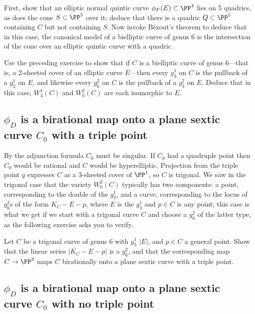 \begin{exercise}
First, show that an elliptic normal quintic curve $\phi_F(E) \subset \PP^4$ lies on 5 quadrics, as does the cone $S \subset \PP^5$ over it; deduce that there is a quadric $Q \subset \PP^5$ containing $C$ but not containing $S$. Now invoke B\'ezout's theorem to deduce that in this case, the canonical model of a bielliptic curve of genus 6 is the intersection of the cone over an elliptic quintic curve with a quadric.
\end{exercise}


\begin{exercise}
Use the preceding exercise to show that if $C$ is a bielliptic curve of genus 6---that is, a 2-sheeted cover of an elliptic curve $E$---then every $g^1_4$ on $C$ is the pullback of a $g^1_2$ on $E$, and likewise  every $g^2_6$ on $C$ is the pullback of a $g^2_3$ on $E$. Deduce that in this case, $W^1_4(C)$ and $W^2_6(C)$ are each isomorphic to $E$.
\end{exercise}

\subsection{$\phi_{D}$ is a birational map onto a plane sextic curve $C_{0}$ with a triple point}

By the adjunction formula $C_0$ must be singular. If $C_0$ had a quadruple point then $C_{0}$
would be rational and  $C$ would be hyperelliptic.
Projection from the triple point $q$ expresses $C$ as a 3-sheeted cover of $\PP^1$, so $C$ is trigonal. We saw in the trigonal case that the variety $W^2_6(C)$ typically has two components: a point, corresponding to the double of the $g^1_3$, and a curve, corresponding to the locus of $g^2_6$s of the form $K_C - E - p$, where $E$ is the $g^1_3$ and $p \in C$ is any point; this case is what we get if we start with a trigonal curve $C$ and choose a $g^2_6$ of the latter type, as the following exercise asks you to verify.


\begin{exercise}
Let $C$ be a trigonal curve of genus 6 with $g^1_3$ $|E|$, and $p \in C$ a general point. Show that the linear series $|K_C - E-p|$ is a $g^2_6$, and that the corresponding map $C \to \PP^2$ maps $C$ birationally onto a plane sextic curve with a triple point.
\end{exercise}

\subsection{$\phi_{D}$ is a birational map onto a plane sextic curve $C_{0}$ with no triple point}

